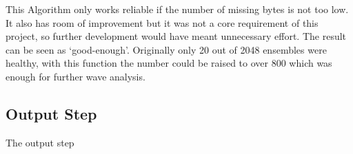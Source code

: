 This Algorithm only works reliable if the number of missing bytes is not too low. It also has room of improvement but it was not a core requirement of this project, so further development would have meant unnecessary effort. The result can be seen as `good-enough'. Originally only 20 out of 2048 ensembles were healthy, with this function the number could be raised to over 800 which was enough for further wave analysis.

\subsection{Output Step}
The output step \cite{adcp}



 